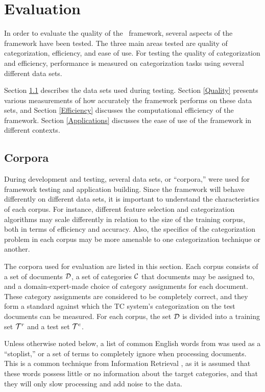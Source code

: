 \chapter{Evaluation}
\label{Evaluation}

In order to evaluate the quality of the \aicat\ framework, several
aspects of the framework have been tested.  The three main areas
tested are quality of categorization, efficiency, and ease of use.
For testing the quality of categorization and efficiency, performance
is measured on categorization tasks using several different data sets.

Section \ref{Corpora} describes the data sets used during testing.
Section \ref{Quality} presents various measurements of how accurately
the framework performs on these data sets, and Section
\ref{Efficiency} discusses the computational efficiency of the
framework.  Section \ref{Applications} discusses the ease of use of
the framework in different contexts.


\section{Corpora}
\label{Corpora}

During development and testing, several data sets, or ``corpora,''
were used for framework testing and application building.  Since the
framework will behave differently on different data sets, it is
important to understand the characteristics of each corpus.  For
instance, different feature selection and categorization algorithms
may scale differently in relation to the size of the training corpus,
both in terms of efficiency and accuracy. \cite{chakrabarti:98} Also,
the specifics of the categorization problem in each corpus may be more
amenable to one categorization technique or another.

The corpora used for evaluation are listed in this section.  Each
corpus consists of a set of documents $\mathcal{D}$, a set of categories $\mathcal{C}$ that
documents may be assigned to, and a domain-expert-made choice of
category assignments for each document.  These category assignments
are considered to be completely correct, and they form a standard
against which the TC system's categorization on the test documents can
be measured.  For each corpus, the set $\mathcal{D}$ is divided into a
training set $\mathcal{T}^r$ and a test set $\mathcal{T}^e$.

Unless otherwise noted below, a list of common English words from
\cite{salton:89} was used as a ``stoplist,'' or a set of terms to
completely ignore when processing documents.  This is a common technique from
Information Retrieval \cite[sec. 15.1.1]{manning:99}, as it is assumed that these words
possess little or no information about the target categories, and that
they will only slow processing and add noise to the data.


